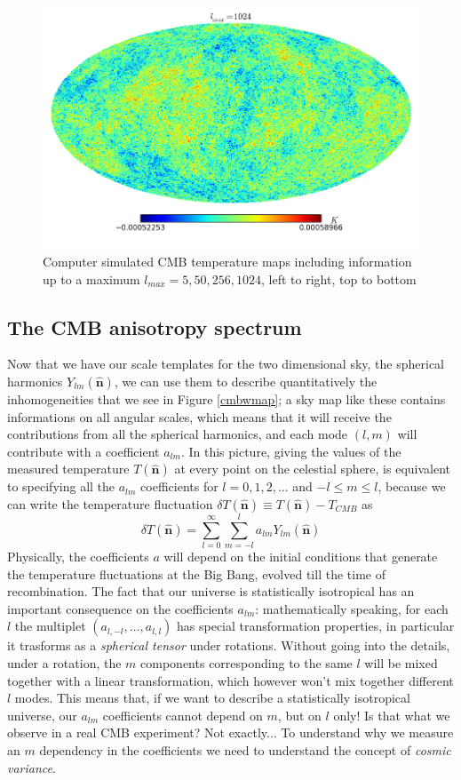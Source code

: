 \documentclass[11pt, a4paper,oneside,openright]{book}
\numberwithin{equation}{section}
\begin{document}
\begin{figure}
\begin{center}
\includegraphics[scale=0.3]{CMB/l1024.png}
\end{center}
\caption{Computer simulated CMB temperature maps including information up to a maximum $l_{max}=5,50,256,1024$, left to right, top to bottom}
\label{simcmbsky}
\end{figure}
\subsection{The CMB anisotropy spectrum}
Now that we have our scale templates for the two dimensional sky, the spherical harmonics $Y_{lm}(\mathbf{\hat{n}})$, we can use them to describe quantitatively the inhomogeneities that we see in Figure \ref{cmbwmap}; a sky map like these contains informations on all angular scales, which means that it will receive the contributions from all the spherical harmonics, and each mode $(l,m)$ will contribute with a coefficient $a_{lm}$. In this picture, giving the values of the measured temperature $T(\mathbf{\hat{n}})$ at every point on the celestial sphere, is equivalent to specifying all the $a_{lm}$ coefficients for $l=0,1,2,...$ and $-l\leq m \leq l$, because we can write the temperature fluctuation $\delta T(\mathbf{\hat{n}})\equiv T(\mathbf{\hat{n}})-T_{CMB}$ as 
\begin{equation}
\delta T(\mathbf{\hat{n}})=\sum_{l=0}^{\infty}\sum_{m=-l}^la_{lm}Y_{lm}(\mathbf{\hat{n}})
\end{equation}
Physically, the coefficients $a$ will depend on the initial conditions that generate the temperature fluctuations at the Big Bang, evolved till the time of recombination. The fact that our universe is statistically isotropical has an important consequence on the coefficients $a_{lm}$: mathematically speaking, for each $l$ the multiplet $(a_{l,-l},...,a_{l,l})$ has special transformation properties, in particular it trasforms as a \textit{spherical tensor} under rotations. Without going into the details, under a rotation, the $m$ components corresponding to the same $l$ will be mixed together with a linear transformation, which however won't mix together different $l$ modes. This means that, if we want to describe a statistically isotropical universe, our $a_{lm}$ coefficients cannot depend on $m$, but on $l$ only! Is that what we observe in a real CMB experiment? Not exactly... To understand why we measure an $m$ dependency in the coefficients we need to understand the concept of \textit{cosmic variance}.   
\end{document}
